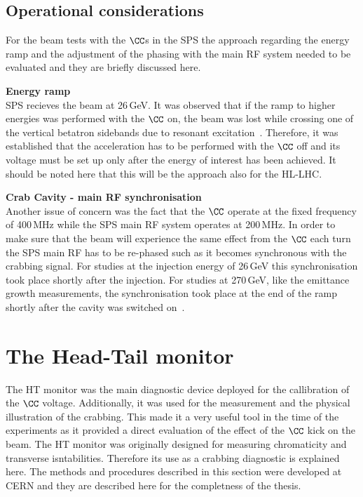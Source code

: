 \subsection{Operational considerations}

For the beam tests with the $\CC$s in the SPS the approach regarding the energy ramp and the adjustment of the phasing with the main RF system needed to be evaluated and they are briefly discussed here.


\normalsize{\textbf{Energy ramp}}\\
SPS recieves the beam at 26\,GeV. It was observed that if the ramp to higher energies was performed with the $\CC$ on, the beam was lost while crossing one of the vertical betatron sidebands due to resonant excitation~\cite{Rama_Paris_persentation}. Therefore, it was established that the acceleration has to be performed with the $\CC$ off and its voltage must be set up only after the energy of interest has been achieved. It should be noted here that this will be the approach also for the HL-LHC.

\normalsize{\textbf{Crab Cavity - main RF synchronisation}}\\
Another issue of concern was the fact that the $\CC$ operate at the fixed frequency of 400\,MHz while the SPS main RF system operates at 200\,MHz.
In order to make sure that the beam will experience the same effect from the $\CC$ each turn the SPS main RF has to be re-phased such as it becomes synchronous with the crabbing signal. For studies at the injection energy of 26\,GeV this synchronisation took place shortly after the injection. For studies at 270\,GeV, like the emittance growth measurements, the synchronisation took place at the end of the ramp shortly after the cavity was switched on~\cite{BE_seminar}.


\section{The Head-Tail monitor}\label{sec:HT_info}
The HT monitor was the main diagnostic device deployed for the callibration of the $\CC$ voltage. Additionally, it was used for the measurement and the physical illustration of the crabbing. This made it a very useful tool in the time of the experiments as it provided a direct evaluation of the effect of the $\CC$ kick on the beam. The HT monitor was originally designed for measuring chromaticity and transverse isntabilities. Therefore its use as a crabbing diagnostic is explained here. The methods and procedures described in this section were developed at CERN and they are described here for the completness of the thesis.

